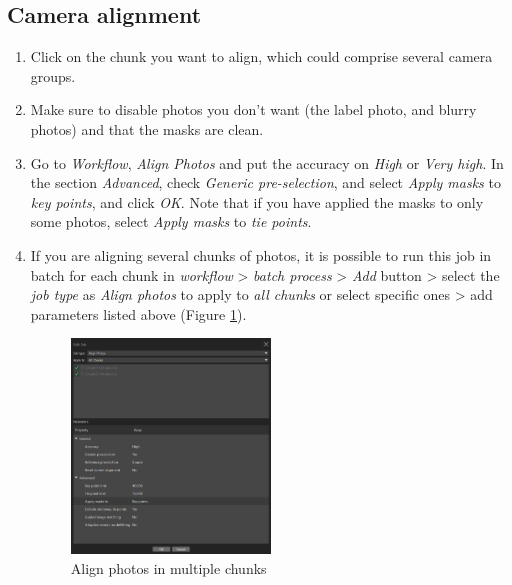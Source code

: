 \documentclass[10pt,letter,english]{article}
\begin{document}
\subsection{Camera alignment}
\begin{enumerate}
    \item Click on the chunk you want to align, which could comprise several camera groups.
    \item Make sure to disable photos you don't want (the label photo, and blurry photos) and that the masks are clean.
    \item Go to \textit{Workflow}, \textit{Align Photos} and put the accuracy on \textit{High} or \textit{Very high}. In the section \textit{Advanced}, check \textit{Generic pre-selection}, and select \textit{Apply masks} to \textit{key points}, and click \textit{OK}. Note that if you have applied the masks to only some photos, select \textit{Apply masks} to \textit{tie points}.
    \item If you are aligning several chunks of photos, it is possible to run this job in batch for each chunk in \textit{workflow} > \textit{batch process} > \textit{Add} button > select the \textit{job type} as \textit{Align photos} to apply to \textit{all chunks} or select specific ones > add parameters listed above (Figure \ref{batch_alignment}).

    
\begin{figure}[H]
    \centering
    \includegraphics[width=0.5\textwidth]{Figures/metashape_batch_align.png}
    \caption{Align photos in multiple chunks}
    \label{batch_alignment}
\end{figure}


\end{enumerate}
\end{document}
